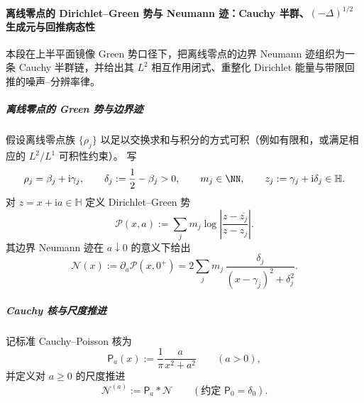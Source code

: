 \paragraph{离线零点的 Dirichlet--Green 势与 Neumann 迹：Cauchy 半群、\texorpdfstring{$(-\Delta)^{1/2}$}{(-Δ)^{1/2}} 生成元与回推病态性}
本段在上半平面镜像 Green 势口径下，把离线零点的边界 Neumann 迹组织为一条 Cauchy 半群链，并给出其 \(L^2\) 相互作用闭式、重整化 Dirichlet 能量与带限回推的噪声--分辨率律。

\subparagraph{离线零点的 Green 势与边界迹}
假设离线零点族 \(\{\rho_j\}\) 以足以交换求和与积分的方式可积（例如有限和，或满足相应的 \(L^2/L^1\) 可积性约束）。
写
\[
\rho_j=\beta_j+\mathrm{i}\gamma_j,\qquad
\delta_j:=\frac12-\beta_j>0,\qquad
m_j\in\NN,\qquad
z_j:=\gamma_j+\mathrm{i}\delta_j\in\mathbb H.
\]
对 \(z=x+\mathrm{i}a\in\mathbb H\) 定义 Dirichlet--Green 势
\begin{equation}\label{eq:xi-offline-green-potential-P}
\mathcal P(x,a):=\sum_j m_j\log\left|\frac{z-\overline{z_j}}{z-z_j}\right|.
\end{equation}
其边界 Neumann 迹在 \(a\downarrow0\) 的意义下给出
\begin{equation}\label{eq:xi-offline-green-neumann-trace-N}
\mathcal N(x):=\partial_a\mathcal P(x,0^+)
=2\sum_j m_j\,\frac{\delta_j}{(x-\gamma_j)^2+\delta_j^2}.
\end{equation}

\subparagraph{Cauchy 核与尺度推进}
记标准 Cauchy--Poisson 核为
\[
\mathsf P_a(x):=\frac{1}{\pi}\frac{a}{x^2+a^2}\qquad(a>0),
\]
并定义对 \(a\ge 0\) 的尺度推进
\[
\mathcal N^{(a)}:=\mathsf P_a*\mathcal N\qquad(\text{约定 }\mathsf P_0=\delta_0).
\]

